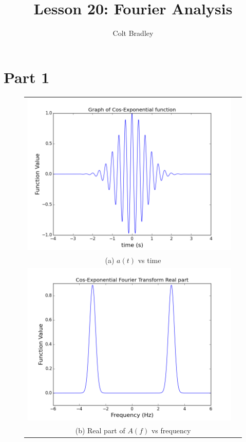\documentclass[11pt]{article}
\begin{document}
\title{Lesson 20: Fourier Analysis}
\author{Colt Bradley}
\date{}
\maketitle

\section{Part 1}

\begin{figure}[ht]
\centering
\begin{tabular}{cc}
\includegraphics[scale=.4]{cos_wavepacket.png} \\
\multicolumn{2}{c}{(a) $a(t)$ vs time} \\[6pt]

\includegraphics[scale=.4]{cos_fourReal.png}\\
\multicolumn{2}{c}{(b) Real part of $A(f)$ vs frequency} \\[6pt]


\end{tabular}
\end{figure}
\end{document}
